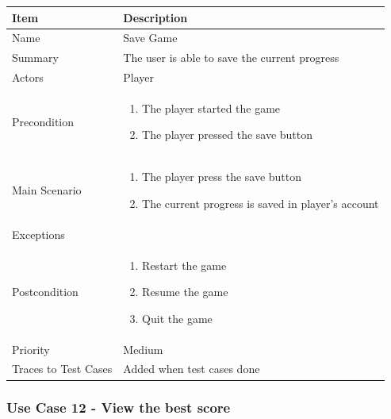 \documentclass[12pt]{article}
\begin{document}
\begin{center}
\setlength{\tabcolsep}{18pt}
\renewcommand{\arraystretch}{1.3}
\begin{tabular}{ |p{3cm}|p{10cm}| }
    \hline
    \rowcolor{green}
   Item & Description \\
    \hline
    Name & Save Game \\
    \hline
    Summary & The user is able to save the current progress \\
    \hline
    Actors & Player \\
    \hline
    Precondition & 
    \vspace*{-0.2in}
    \begin{enumerate}
        \item The player started the game
        \item The player pressed the save button
    \end{enumerate}  \\
    \hline
    Main Scenario &     
    \vspace*{-0.2in}
    \begin{enumerate}
        \item The player press the save button
        \item The current progress is saved in player's account
    \end{enumerate}  \\
    \hline
    Exceptions & \\
    \hline
    Postcondition &
    \vspace*{-0.2in}
    \begin{enumerate}
        \item Restart the game
        \item Resume the game
        \item Quit the game
    \end{enumerate}  \\
    \hline
    Priority & Medium \\
    \hline
    Traces to Test Cases & Added when test cases done  \\
    \hline
\end{tabular}
\end{center}

\newpage


\subsubsection{Use Case 12 - View the best score} \label{uc:12}
\end{document}

